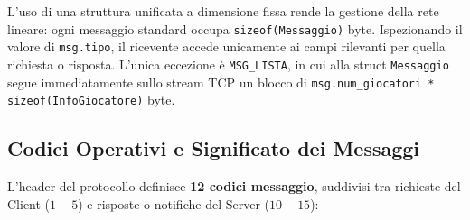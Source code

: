 \documentclass[11pt,a4paper]{article}
\begin{document}
L'uso di una struttura unificata a dimensione fissa rende la gestione della rete lineare: ogni messaggio standard occupa \texttt{sizeof(Messaggio)} byte. Ispezionando il valore di \texttt{msg.tipo}, il ricevente accede unicamente ai campi rilevanti per quella richiesta o risposta. L'unica eccezione è \texttt{MSG\_LISTA}, in cui alla struct \texttt{Messaggio} segue immediatamente sullo stream TCP un blocco di \texttt{msg.num\_giocatori * sizeof(InfoGiocatore)} byte.

\subsection{Codici Operativi e Significato dei Messaggi}

L'header del protocollo definisce \textbf{12 codici messaggio}, suddivisi tra richieste del Client ($1 - 5$) e risposte o notifiche del Server ($10 - 15$):
\end{document}
